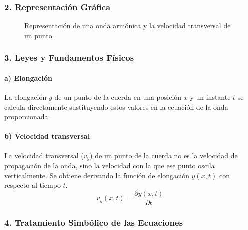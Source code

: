 \subsubsection*{2. Representación Gráfica}
\begin{figure}[H]
    \centering
    \caption{Representación de una onda armónica y la velocidad transversal de un punto.}
\end{figure}

\subsubsection*{3. Leyes y Fundamentos Físicos}
\paragraph{a) Elongación}
La elongación $y$ de un punto de la cuerda en una posición $x$ y un instante $t$ se calcula directamente sustituyendo estos valores en la ecuación de la onda proporcionada.

\paragraph{b) Velocidad transversal}
La velocidad transversal ($v_y$) de un punto de la cuerda no es la velocidad de propagación de la onda, sino la velocidad con la que ese punto oscila verticalmente. Se obtiene derivando la función de elongación $y(x,t)$ con respecto al tiempo $t$.
$$ v_y(x,t) = \frac{\partial y(x,t)}{\partial t} $$

\subsubsection*{4. Tratamiento Simbólico de las Ecuaciones}
